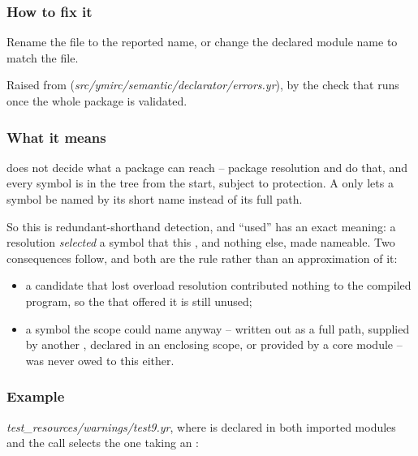 \subsubsection*{How to fix it}

Rename the file to the reported name, or change the declared module name to match the file.

\label{sec:codes:e3038}

Raised from  (\textit{src/\allowbreak{}ymirc/\allowbreak{}semantic/\allowbreak{}declarator/\allowbreak{}errors.yr}), by the check that runs once the whole package is validated.

\subsubsection*{What it means}

 does not decide what a package can reach -- package resolution and  do that, and every symbol is in the tree from the start, subject to protection. A  only lets a symbol be named by its short name instead of its full path.

So this is redundant-shorthand detection, and ``used'' has an exact meaning: a resolution \textit{selected} a symbol that this , and nothing else, made nameable. Two consequences follow, and both are the rule rather than an approximation of it:

\begin{itemize}
\item a candidate that lost overload resolution contributed nothing to the compiled program, so the  that offered it is still unused;
\item a symbol the scope could name anyway -- written out as a full path, supplied by another , declared in an enclosing scope, or provided by a core module -- was never owed to this  either.
\end{itemize}

\subsubsection*{Example}

\textit{test\_\allowbreak{}resources/\allowbreak{}warnings/\allowbreak{}test9.yr}, where  is declared in both imported modules and the call selects the one taking an :

